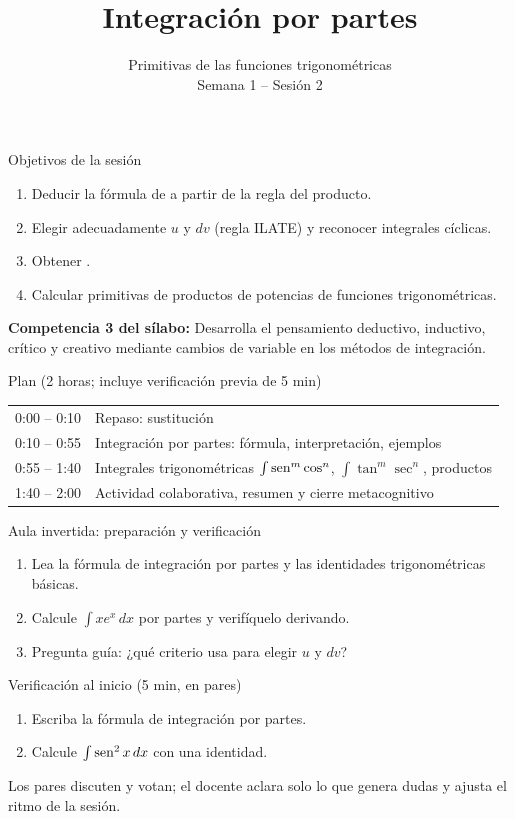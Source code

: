\documentclass[10pt,aspectratio=169]{beamer}
\title[Partes y trigonométricas]{Integración por partes}
\subtitle{Primitivas de las funciones trigonométricas\\[2pt]\small Semana 1 -- Sesión 2}
\begin{document}
\begin{frame}
  \titlepage
\end{frame}

\begin{frame}{Objetivos de la sesión}
  \begin{enumerate}
    \item Deducir la fórmula de  a partir de la regla del producto.
    \item Elegir adecuadamente $u$ y $dv$ (regla ILATE) y reconocer integrales cíclicas.
    \item Obtener .
    \item Calcular primitivas de productos de potencias de funciones trigonométricas.
  \end{enumerate}
  \vspace{1mm}
  {\small\textbf{Competencia 3 del sílabo:} Desarrolla el pensamiento deductivo, inductivo, crítico y creativo mediante cambios de variable en los métodos de integración.}
  \begin{block}{Plan (2 horas; incluye verificación previa de 5 min)}
    \begin{tabular}{ll}
      0:00 -- 0:10 & Repaso: sustitución\\
      0:10 -- 0:55 & Integración por partes: fórmula, interpretación, ejemplos\\
      0:55 -- 1:40 & Integrales trigonométricas $\int\operatorname{sen}^m\cos^n$, $\int\tan^m\sec^n$, productos\\
      1:40 -- 2:00 & Actividad colaborativa, resumen y cierre metacognitivo
    \end{tabular}
  \end{block}
\end{frame}

\begin{frame}{Aula invertida: preparación y verificación}
  \small
  \begin{previa}
    \begin{enumerate}
      \item Lea la fórmula de integración por partes y las identidades trigonométricas básicas.
      \item Calcule $\int xe^x\,dx$ por partes y verifíquelo derivando.
      \item Pregunta guía: ¿qué criterio usa para elegir $u$ y $dv$?
    \end{enumerate}
  \end{previa}
  \begin{block}{Verificación al inicio (5 min, en pares)}
    \begin{enumerate}
      \item Escriba la fórmula de integración por partes.
      \item Calcule $\int\operatorname{sen}^2x\,dx$ con una identidad.
    \end{enumerate}
    Los pares discuten y votan; el docente aclara solo lo que genera dudas y ajusta el ritmo de la sesión.
  \end{block}
\end{frame}
\end{document}
